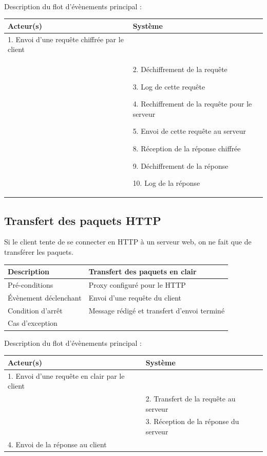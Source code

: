 \documentclass[a4paper,11pt,french]{article}
\begin{document}
~\\

Description du flot d'évènements principal :

\begin{tabular}{|m{8cm}|m{8cm}|}
   \hline
  \rowcolor[gray]{.8} Acteur(s) & Système \\
   \hline
   1. Envoi d'une requête chiffrée par le client & \\
   \hline
    &
2. Déchiffrement de la requête

3. Log de cette requête

4. Rechiffrement de la requête pour le serveur

5. Envoi de cette requête au serveur


8. Réception de la réponse chiffrée

9. Déchiffrement de la réponse

10. Log de la réponse\\
\hline
\end{tabular}



\subsection{Transfert des paquets HTTP}

Si le client tente de se connecter en HTTP à un serveur web, on ne fait que de transférer les paquets.

\begin{tabular}{|>{\columncolor[gray]{.8}}m{4cm}|m{12cm}|}
   \hline
   Description & Transfert des paquets en clair \\
   \hline
   Pré-conditions & Proxy configuré pour le HTTP\\
   \hline
   Évènement déclenchant &  Envoi d'une requête du client\\
   \hline
   Condition d'arrêt & Message rédigé et transfert d’envoi terminé \\
   \hline
   Cas d'exception  & \\
   \hline   
\end{tabular}

Description du flot d'évènements principal :

\begin{tabular}{|m{8cm}|m{8cm}|}
   \hline
  \rowcolor[gray]{.8} Acteur(s) & Système \\
   \hline
   1. Envoi d'une requête en clair par le client & \\
   \hline
& 2. Transfert de la requête au serveur  \\
& 3. Réception de la réponse du serveur  \\
   \hline
  
4. Envoi de la réponse au client  &  \\
   \hline
\end{tabular}
\end{document}

